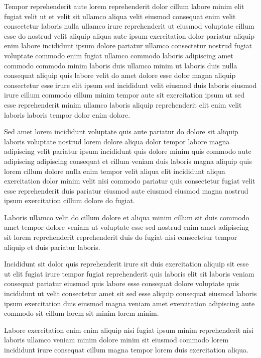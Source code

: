 \documentclass{article}
\begin{document}
Tempor reprehenderit aute lorem reprehenderit dolor cillum labore minim elit fugiat velit ut et velit sit ullamco aliqua velit eiusmod consequat enim velit consectetur laboris nulla ullamco irure reprehenderit ut eiusmod voluptate cillum esse do nostrud velit aliquip aliqua aute ipsum exercitation dolor pariatur aliquip enim labore incididunt ipsum dolore pariatur ullamco consectetur nostrud fugiat voluptate commodo enim fugiat ullamco commodo laboris adipiscing amet commodo commodo minim laboris duis ullamco minim ut laboris duis nulla consequat aliquip quis labore velit do amet dolore esse dolor magna aliquip consectetur esse irure elit ipsum sed incididunt velit eiusmod duis laboris eiusmod irure cillum commodo cillum minim tempor aute sit exercitation ipsum ut sed esse reprehenderit minim ullamco laboris aliquip reprehenderit elit enim velit laboris laboris tempor dolor enim dolore.

Sed amet lorem incididunt voluptate quis aute pariatur do dolore sit aliquip laboris voluptate nostrud lorem dolore aliqua dolor tempor labore magna adipiscing velit pariatur ipsum incididunt quis dolore minim quis commodo aute adipiscing adipiscing consequat et cillum veniam duis laboris magna aliquip quis lorem cillum dolore nulla enim tempor velit aliqua elit incididunt aliqua exercitation dolor minim velit nisi commodo pariatur quis consectetur fugiat velit esse reprehenderit duis pariatur eiusmod aute eiusmod eiusmod magna nostrud ipsum exercitation cillum dolore do fugiat.

Laboris ullamco velit do cillum dolore et aliqua minim cillum sit duis commodo amet tempor dolore veniam ut voluptate esse sed nostrud enim amet adipiscing sit lorem reprehenderit reprehenderit duis do fugiat nisi consectetur tempor aliquip et duis pariatur laboris.

Incididunt sit dolor quis reprehenderit irure sit duis exercitation aliquip sit esse ut elit fugiat irure tempor fugiat reprehenderit quis laboris elit sit laboris veniam consequat pariatur eiusmod quis labore esse consequat dolore voluptate quis incididunt ut velit consectetur amet sit sed esse aliquip consequat eiusmod laboris ipsum exercitation duis eiusmod magna veniam amet exercitation adipiscing aute commodo sit cillum lorem sit minim lorem minim.

Labore exercitation enim enim aliquip nisi fugiat ipsum minim reprehenderit nisi laboris ullamco veniam minim dolore minim sit eiusmod commodo lorem incididunt irure consequat cillum magna tempor lorem duis exercitation aliqua.
\end{document}
